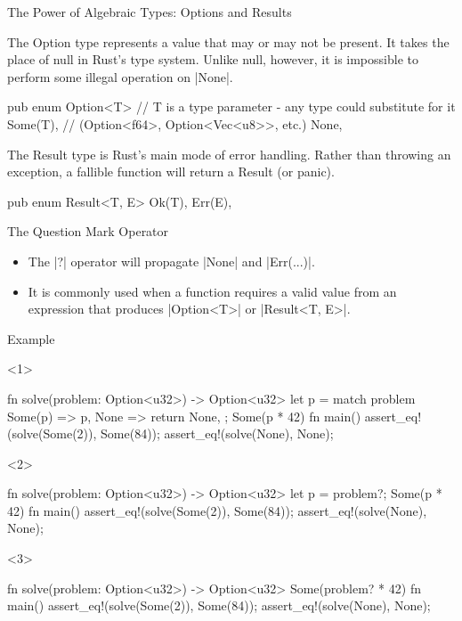 \documentclass[8pt, aspectratio=169]{beamer}
\begin{document}
{\begin{frame}[fragile]{The Power of Algebraic Types: Options and Results}
\begin{definition}[Option]
The Option type represents a value that may or may not be present. It takes the place of null in Rust's type system. Unlike null, however, it is impossible to perform some illegal operation on \rustinline|None|.
\begin{rustcode}
pub enum Option<T> { // T is a type parameter - any type could substitute for it
    Some(T),         // (Option<f64>, Option<Vec<u8>>, etc.)
    None,
}
\end{rustcode}
\end{definition}
\begin{definition}[Result]
The Result type is Rust's main mode of error handling. Rather than throwing an exception, a fallible function will return a Result (or panic).
\begin{rustcode}
pub enum Result<T, E> {
   Ok(T),
   Err(E),
}
\end{rustcode}
\end{definition}
\end{frame}

\begin{frame}[fragile]{The Question Mark Operator}
\begin{itemize}
\item The \rustinline|?| operator will propagate \rustinline|None| and \rustinline|Err(...)|.
\item It is commonly used when a function requires a valid value from an expression that produces \rustinline|Option<T>| or \rustinline|Result<T, E>|.
\end{itemize}
\begin{exampleblock}{Example}
\begin{onlyenv}<1>
\begin{rustcode}
fn solve(problem: Option<u32>) -> Option<u32> {
    let p = match problem {
        Some(p) => p,
        None => return None,
    }; 
    Some(p * 42)
} 
fn main() {
    assert_eq!(solve(Some(2)), Some(84));
    assert_eq!(solve(None), None);
}
\end{rustcode}
\end{onlyenv}
\begin{onlyenv}<2>
\begin{rustcode}
fn solve(problem: Option<u32>) -> Option<u32> {
    let p = problem?;
    Some(p * 42)
}
fn main() {
    assert_eq!(solve(Some(2)), Some(84));
    assert_eq!(solve(None), None);
}
\end{rustcode}
\end{onlyenv}
\begin{onlyenv}<3>
\begin{rustcode}
fn solve(problem: Option<u32>) -> Option<u32> {
    Some(problem? * 42)
}
fn main() {
    assert_eq!(solve(Some(2)), Some(84));
    assert_eq!(solve(None), None);
}
\end{rustcode}
\end{onlyenv}
\end{exampleblock}
\end{frame}

}
\end{document}
